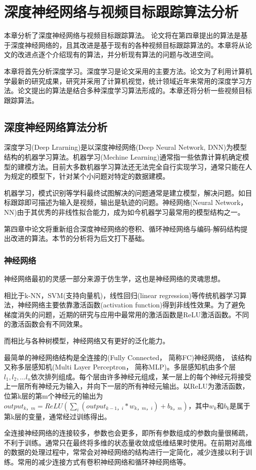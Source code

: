 
\chapter{深度神经网络与视频目标跟踪算法分析}
本章分析了深度神经网络与视频目标跟踪算法。
论文将在第四章提出的算法是基于深度神经网络的，且其改进是基于现有的各种视频目标跟踪算法的。本章将从论文的改进点逐个介绍现有的算法，并分析现有算法的问题与改进空间。
\par
本章将首先分析深度学习。深度学习是论文采用的主要方法。论文为了利用计算机学最新的研究成果，研究并采用了计算机视觉，统计领域近年来常用的深度学习方法。论文提出的算法是结合多种深度学习算法形成的。本章还将分析一些视频目标跟踪算法。

\section{深度神经网络算法分析}
深度学习(Deep Lrarning)是以深度神经网络(Deep Neural Network, DNN)为模型结构的机器学习算法\supercite{deng2014deep}。机器学习(Mechine Learning)通常指一些依靠计算机确定模型的建模方法。目前大多数机器学习算法还无法完全自行实现学习，通常只能在人为规定的模型下，针对某个小问题对特定的数据建模。
\par
机器学习，模式识别等学科最终试图解决的问题通常是建立模型，解决问题。如目标跟踪即可描述为输入是视频，输出是轨迹的问题。神经网络(Neural Network， NN)由于其优秀的非线性拟合能力，成为如今机器学习最常用的模型结构之一。
\par
第四章中论文将重新组合深度神经网络的卷积、循环神经网络与编码-解码结构提出改进的算法。本节的分析将为后文打下基础。

\subsection{神经网络}
神经网络最初的灵感一部分来源于仿生学\supercite{mcculloch1943logical}\supercite{farley1954simulation}，这也是神经网络的灵魂思想。
\par
相比于k-NN，SVM(支持向量机)，线性回归(linear regression)等传统机器学习算法，神经网络主要依靠激活函数(activation function)得到非线性效果。为了避免梯度消失的问题，近期的研究与应用中最常用的激活函数是ReLU激活函数\supercite{krizhevsky2012imagenet}。不同的激活函数会有不同效果\supercite{karlik2011performance}。
\par
而相比与各种树模型，神经网络又有更好的泛化能力。
\par
最简单的神经网络结构是全连接的(Fully Connected， 简称FC)神经网络， 该结构又称多层感知机(Multi Layer Perceptron， 简称MLP)。多层感知机由多个层$l_1,l_2,...l_n$依次排列组成。每个层由许多神经元组成，某一层上的每个神经元将接受上一层所有神经元为输入，并向下一层的所有神经元输出。以ReLU为激活函数，位第k层的第m个神经元的输出为$output_{k，m}=ReLU(\sum_{i} (output_{k-1，i}*w_{k，m，i})+b_{k，m})$，其中$w_{k}$和$b_{k}$是属于第k层的变量，通常经过训练得出。
\par
全连接神经网络的连接较多，参数也会更多，即所有参数组成的参数向量很稀疏，不利于训练。通常只在最终将多维的状态量收敛成低维结果时使用。在前期对高维的数据的处理过程中，常常会对神经网络的结构进行一定简化，减少连接以利于训练。常用的减少连接方式有卷积神经网络和循环神经网络等。
\par
